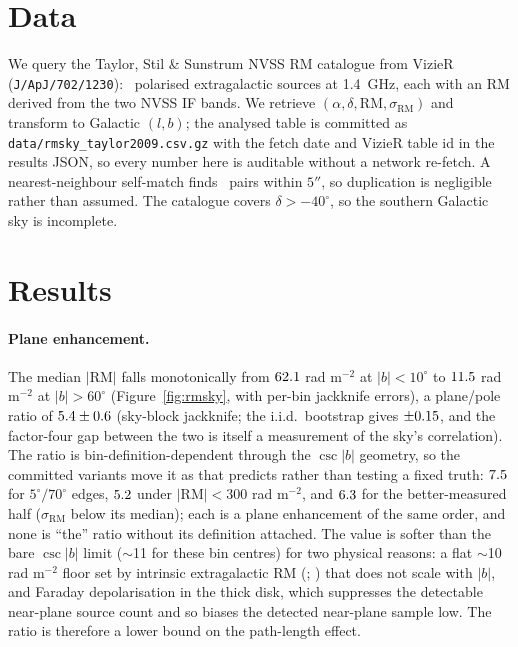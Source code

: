 \documentclass[twocolumn]{aastex631}
\newcommand{\code}[1]{\texttt{#1}}
\begin{document}
\section{Data}
We query the Taylor, Stil \& Sunstrum \citeyearpar{taylor2009} NVSS RM catalogue from VizieR
(\code{J/ApJ/702/1230}): \rmN\ polarised extragalactic sources at 1.4~GHz, each with an RM derived
from the two NVSS IF bands. We retrieve $(\alpha,\delta,\mathrm{RM},\sigma_\mathrm{RM})$ and
transform to Galactic $(l,b)$; the analysed table is committed as
\code{data/rmsky\_taylor2009.csv.gz} with the fetch date and VizieR table id in the results
JSON, so every number here is auditable without a network re-fetch. A nearest-neighbour
self-match finds \rmDupCount\ pairs within $5''$, so duplication is negligible rather than
assumed. The catalogue covers $\delta>-40^\circ$, so the southern Galactic sky is incomplete.

\section{Results}
\paragraph{Plane enhancement.} The median $|\mathrm{RM}|$ falls monotonically from $62.1$ rad
m$^{-2}$ at $|b|<10^\circ$ to $11.5$ rad m$^{-2}$ at $|b|>60^\circ$ (Figure~\ref{fig:rmsky},
with per-bin jackknife errors), a plane/pole ratio of $5.4\pm0.6$ (sky-block
jackknife; the i.i.d.\ bootstrap gives $\pm0.15$, and the factor-four gap between the two
is itself a measurement of the sky's correlation). The ratio is bin-definition-dependent through
the $\csc|b|$ geometry, so the committed variants move it as that predicts rather than testing a
fixed truth: $7.5$ for $5^\circ/70^\circ$ edges, $5.2$ under
$|\mathrm{RM}|<300$ rad m$^{-2}$, and $6.3$ for the better-measured half ($\sigma_\mathrm{RM}$ below its median); each is a plane enhancement of the same order, and none is ``the'' ratio without its definition attached. The value is softer than the bare
$\csc|b|$ limit ($\sim$11 for these bin centres) for two physical reasons: a flat $\sim$10 rad
m$^{-2}$ floor set by intrinsic extragalactic RM (\citealt{schnitzeler2010}; \citealt{mao2010})
that does not scale with $|b|$, and Faraday depolarisation in the thick disk, which suppresses
the detectable near-plane source count and so biases the detected near-plane sample low. The
ratio is therefore a lower bound on the path-length effect.
\end{document}
